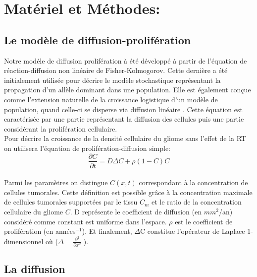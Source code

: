 \documentclass[12pt,a4paper]{article}
\begin{document}
\vspace{1cm}


\section{Matériel et Méthodes:}
	\subsection{Le modèle de diffusion-prolifération}
	\renewcommand{\thesubsubsection}{\alph{subsubsection})}
Notre modéle de diffusion prolifération à été développé à partir de l'équation de réaction-diffusion non linéaire de Fisher-Kolmogorov. Cette dernière a été initialement utilisée pour décrire le modèle stochastique représentant la propagation d’un allèle dominant dans une population. Elle est également conçue comme l’extension naturelle de la croissance logistique d’un modèle de population, quand celle-ci se disperse via diffusion linéaire \cite{l}.
Cette équation est caractérisée par une partie représentant la diffusion des cellules puis une partie considérant la prolifération cellulaire. \\
Pour décrire la croissance de la densité cellulaire du gliome sans l'effet de la RT on utilisera l'équation de prolifération-diffusion simple: 
\begin{equation}
\frac{\partial C}{\partial t}  = D\Delta C + \rho (1 - C) C 
\end{equation}
\\
Parmi les paramètres on distingue $C(x,t)$ correspondant à la concentration de cellules tumorales. Cette définition est possible grâce à la concentration maximale de cellules tumorales supportées par le tissu $C_m$ et le ratio de la concentration cellulaire du gliome $C$.  D représente le coefficient de diffusion (en $mm^2$/an) considéré comme constant est uniforme dans l’espace. $\rho$ est le coefficient de prolifération (en années$^{-1}$). Et finalement, $\Delta$C constitue l’opérateur de Laplace 1-dimensionnel où  ($\Delta = \frac{\partial ^2}{\partial x^ 2}$ ). \\   

\subsection{La diffusion}
\end{document}
